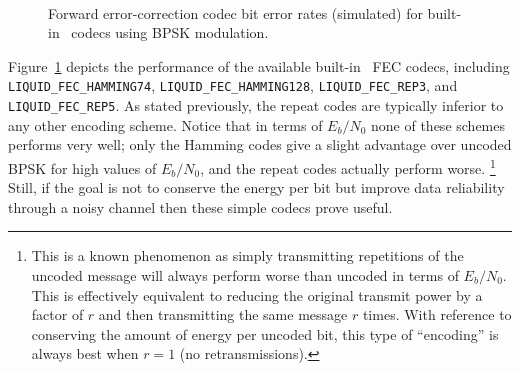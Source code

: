 \begin{figure}
\centering
\mbox{
} \quad
\mbox{
   \quad
}
\caption{Forward error-correction codec bit error rates (simulated)
         for built-in \liquid\ codecs
         using BPSK modulation.}
\label{fig:fec:hamming_ber}
\end{figure}
%
Figure~\ref{fig:fec:hamming_ber} depicts the performance of the
available built-in \liquid\ FEC codecs, including
{\tt LIQUID\_FEC\_HAMMING74},
{\tt LIQUID\_FEC\_HAMMING128},
{\tt LIQUID\_FEC\_REP3}, and
{\tt LIQUID\_FEC\_REP5}.
As stated previously, the repeat codes are typically inferior to any
other encoding scheme.
Notice that in terms of $E_b/N_0$ none of these schemes performs very
well;
only the Hamming codes give a slight advantage over uncoded BPSK for
high values of $E_b/N_0$,
and the repeat codes actually perform worse.%
\footnote{This is a known phenomenon as simply transmitting repetitions
          of the uncoded message will always perform worse than uncoded
          in terms of $E_b/N_0$.
          This is effectively equivalent to reducing the original
          transmit power by a factor of $r$ and then transmitting the
          same message $r$ times.
          With reference to conserving the amount of energy per uncoded
          bit, this type of ``encoding'' is always best when $r=1$
          (no retransmissions).}
Still, if the goal is not to conserve the energy per bit but improve
data reliability through a noisy channel then these simple codecs prove
useful.


